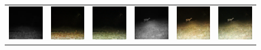 \begin{figure}[htp!]
\begin{tabularx}{\textwidth}{Y Y Y !{\space} Y Y Y}
        \includegraphics{gfx/conditional-with-cycle-gan-qual/nir_S2_B06_R3_PICT3848.jpg} & \includegraphics{gfx/conditional-with-cycle-gan-qual/cyclegan_S2_B06_R3_PICT3848_fake.png} & \includegraphics{gfx/conditional-with-cycle-gan-qual/diff_cycle_gan_S2_B06_R3_PICT3848_fake.png} & \includegraphics{gfx/conditional-with-cycle-gan-qual/nir_S2_B07_R1_PICT3274.jpg} & \includegraphics{gfx/conditional-with-cycle-gan-qual/cyclegan_S2_B07_R1_PICT3274_fake.png} & \includegraphics{gfx/conditional-with-cycle-gan-qual/diff_cycle_gan_S2_B07_R1_PICT3274_fake.png}

\end{tabularx}
\end{figure}
